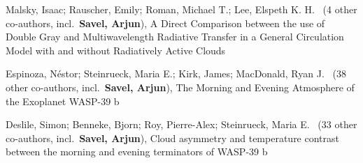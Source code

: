 


\item[{\color{numcolor}\scriptsize3}] Malsky, Isaac; Rauscher, Emily; Roman, Michael T.; Lee, Elspeth K. H. \etal\ ({4} other co-authors, incl.\ \textbf{Savel, Arjun}), A Direct Comparison between the use of Double Gray and Multiwavelength Radiative Transfer in a General Circulation Model with and without Radiatively Active Clouds
\item[{\color{numcolor}\scriptsize2}] Espinoza, Néstor; Steinrueck, Maria E.; Kirk, James; MacDonald, Ryan J. \etal\ ({38} other co-authors, incl.\ \textbf{Savel, Arjun}), The Morning and Evening Atmosphere of the
Exoplanet WASP-39 b
\item[{\color{numcolor}\scriptsize1}] Deslile, Simon; Benneke, Bjorn; Roy, Pierre-Alex; Steinrueck, Maria E. \etal\ ({33} other co-authors, incl.\ \textbf{Savel, Arjun}), Cloud asymmetry and temperature contrast between the morning and evening terminators of WASP-39 b
